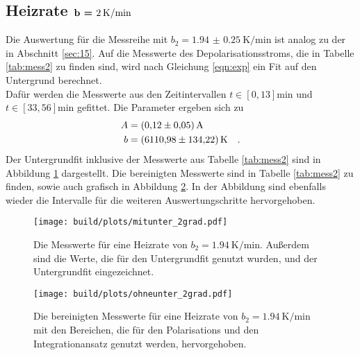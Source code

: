 \subsection{Heizrate $\textbf{b = \SI{2}{\kelvin\per\minute}}$}

\noindent
Die Auswertung für die Messreihe mit $b_2 = \SI{1.94(025)}{\kelvin\per\minute}$ ist analog zu der in Abschnitt \ref{sec:15}. 
Auf die Messwerte des Depolarisationsstroms, die in Tabelle \ref{tab:mess2} zu finden sind, wird nach Gleichung \ref{eqn:exp} ein Fit auf den Untergrund berechnet.\\
Dafür werden die Messwerte aus den Zeitintervallen $t \in [0,13]\si{\minute}$ und $t \in [33,56]\si{\minute}$ gefittet.
Die Parameter ergeben sich zu 
\begin{align*}
  A &= \SI{ 0.12  (005)}{\ampere}\\
  b &= \SI{ 6110.98 (13422)}{\kelvin} \quad .
\end{align*}
Der Untergrundfit inklusive der Messwerte aus Tabelle \ref{tab:mess2} sind in Abbildung \ref{img:mitunter2} dargestellt.
Die bereinigten Messwerte sind in Tabelle \ref{tab:mess2} zu finden, sowie auch grafisch in Abbildung \ref{img:ohneunter2}.
In der Abbildung sind ebenfalls wieder die Intervalle für die weiteren Auswertungschritte hervorgehoben.
\begin{figure}[h]
  \centering
  \texttt{[image: build/plots/mitunter\_2grad.pdf]}
  \caption{Die Messwerte für eine Heizrate von $b_2 = \SI{1.94}{\kelvin\per\minute}$. 
  Außerdem sind die Werte, die für den Untergrundfit genutzt wurden, und der Untergrundfit eingezeichnet.}
  \label{img:mitunter2}
\end{figure}

\begin{figure}[h]
  \centering
  \texttt{[image: build/plots/ohneunter\_2grad.pdf]}
  \caption{Die bereinigten Messwerte für eine Heizrate von $b_2 = \SI{1.94}{\kelvin\per\minute}$ 
  mit den Bereichen, die für den Polarisations und den Integrationansatz genutzt werden, hervorgehoben.}
  \label{img:ohneunter2}
\end{figure}

